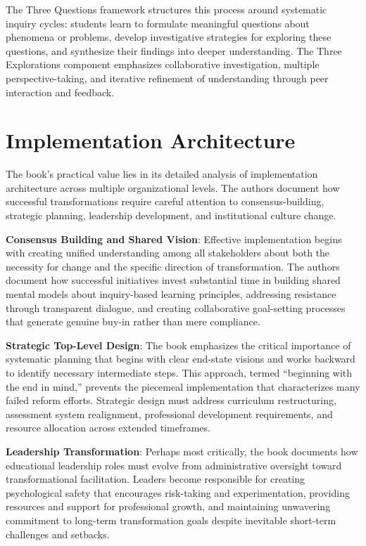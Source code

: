 \documentclass[
  Letterpaper,
]{scrbook}
\begin{document}
The Three Questions framework structures this process around systematic
inquiry cycles: students learn to formulate meaningful questions about
phenomena or problems, develop investigative strategies for exploring
these questions, and synthesize their findings into deeper
understanding. The Three Explorations component emphasizes collaborative
investigation, multiple perspective-taking, and iterative refinement of
understanding through peer interaction and feedback.

\section{Implementation Architecture}\label{implementation-architecture}

The book's practical value lies in its detailed analysis of
implementation architecture across multiple organizational levels. The
authors document how successful transformations require careful
attention to consensus-building, strategic planning, leadership
development, and institutional culture change.

\textbf{Consensus Building and Shared Vision}: Effective implementation
begins with creating unified understanding among all stakeholders about
both the necessity for change and the specific direction of
transformation. The authors document how successful initiatives invest
substantial time in building shared mental models about inquiry-based
learning principles, addressing resistance through transparent dialogue,
and creating collaborative goal-setting processes that generate genuine
buy-in rather than mere compliance.

\textbf{Strategic Top-Level Design}: The book emphasizes the critical
importance of systematic planning that begins with clear end-state
visions and works backward to identify necessary intermediate steps.
This approach, termed ``beginning with the end in mind,'' prevents the
piecemeal implementation that characterizes many failed reform efforts.
Strategic design must address curriculum restructuring, assessment
system realignment, professional development requirements, and resource
allocation across extended timeframes.

\textbf{Leadership Transformation}: Perhaps most critically, the book
documents how educational leadership roles must evolve from
administrative oversight toward transformational facilitation. Leaders
become responsible for creating psychological safety that encourages
risk-taking and experimentation, providing resources and support for
professional growth, and maintaining unwavering commitment to long-term
transformation goals despite inevitable short-term challenges and
setbacks.
\end{document}
